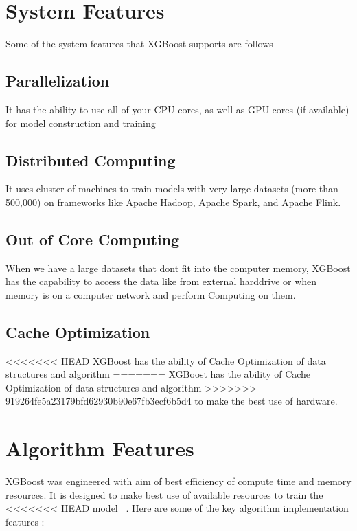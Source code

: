 \section{System Features} 

Some of the system features that XGBoost supports are follows 

\subsection{Parallelization}

It has the ability to use all of your CPU cores, as well as GPU cores (if
available) for model construction and training

\subsection{Distributed Computing}

It uses cluster of machines to train models with very large datasets (more than
500,000) on frameworks like Apache Hadoop, Apache Spark, and Apache Flink.

\subsection{Out of Core Computing}

When we have a large datasets that dont fit into the computer memory, XGBoost
has the capability to access the data  like from external harddrive or when
memory is on a computer network and perform Computing on them.

\subsection{Cache Optimization}

<<<<<<< HEAD
XGBoost has the ability of Cache Optimization of data structures and algorithm
=======
XGBoost has the ability of Cache Optimization of data structures and algorithm 
>>>>>>> 919264fe5a23179bfd62930b90e67fb3ecf6b5d4
to make the best use of hardware.



\section{Algorithm Features} 

XGBoost was engineered with aim of best efficiency of compute time and memory
resources. It is designed to make best use of available resources to train the
<<<<<<< HEAD
model ~\cite{hid-sp18-401-XGBoost-MLmastery}. Here are some of the key algorithm
implementation features :

